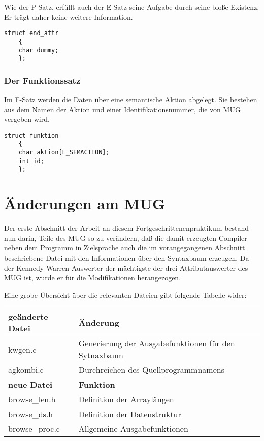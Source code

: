 Wie der P-Satz, erf\"ullt auch der E-Satz seine Aufgabe durch seine blo\ss{}e Existenz. Er tr\"agt daher keine weitere Information.

\begin{small}\begin{verbatim}
struct end_attr
	{
	char dummy;
	};
\end{verbatim}\end{small}

\subsection{Der Funktionssatz}

Im F-Satz werden die Daten \"uber eine semantische Aktion abgelegt. Sie bestehen aus dem Namen der Aktion und einer Identifikationsnummer, die von MUG
vergeben wird.

\begin{small}\begin{verbatim}
struct funktion
	{
	char aktion[L_SEMACTION];
	int id;
	};
\end{verbatim}\end{small}

\pagestyle{headings}

\chapter{\"Anderungen am MUG}

Der erste Abschnitt der Arbeit an diesem Fortgeschrittenenpraktikum bestand nun darin, Teile des MUG so zu ver\"andern, da\ss{} die damit erzeugten Compiler
neben dem Programm in Zielsprache auch die im vorangegangenen Abschnitt beschriebene Datei mit den Informationen \"uber den Syntaxbaum erzeugen. Da der
Kennedy-Warren Auswerter der m\"achtigste der drei Attributauswerter des MUG ist, wurde er f\"ur die Modifikationen herangezogen.

Eine grobe \"Ubersicht \"uber die relevanten Dateien gibt folgende Tabelle wider:

\bigskip
\begin{tabular}{|l|p{8cm}|}
\hline
\bf{ge\"anderte Datei} & \bf{\"Anderung} \\
\hline
kwgen.c & Generierung der Ausgabefunktionen f\"ur den Sytnaxbaum               \\
agkombi.c & Durchreichen des Quellprogrammnamens \\
\hline
\bf{neue Datei} & \bf{Funktion}            \\
\hline
browse\_len.h & Definition der Arrayl\"angen \\
browse\_ds.h & Definition der Datenstruktur\\
browse\_proc.c & Allgemeine Ausgabefunktionen \\
\hline
\end{tabular}
\bigskip

